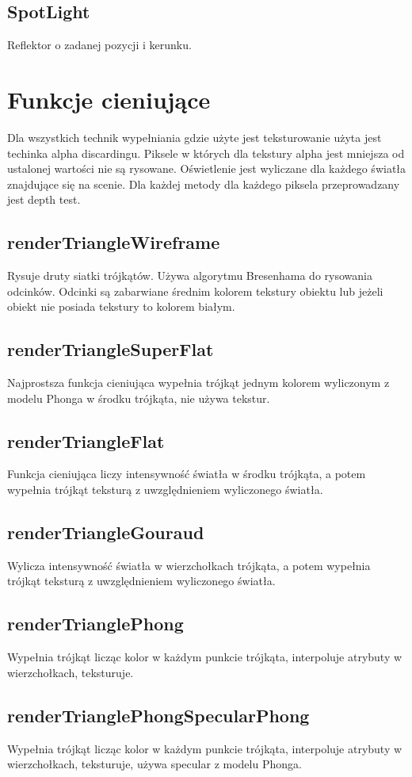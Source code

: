 \documentclass[onecolumn]{article}
\begin{document}
\subsection{SpotLight}
Reflektor o zadanej pozycji i kerunku.

\section{Funkcje cieniujące}
Dla wszystkich technik wypełniania gdzie użyte jest teksturowanie użyta jest techinka alpha discardingu. Piksele w których dla tekstury alpha jest mniejsza od ustalonej wartości nie są rysowane. Oświetlenie jest wyliczane dla każdego światła znajdujące się na scenie. Dla każdej metody dla każdego piksela przeprowadzany jest depth test.
\subsection{renderTriangleWireframe}
Rysuje druty siatki trójkątów. Używa algorytmu Bresenhama do rysowania odcinków. Odcinki są zabarwiane średnim kolorem tekstury obiektu lub jeżeli obiekt nie posiada tekstury to kolorem białym.

\subsection{renderTriangleSuperFlat}
Najprostsza funkcja cieniująca wypełnia trójkąt jednym kolorem wyliczonym z modelu Phonga w środku trójkąta, nie używa tekstur.

\subsection{renderTriangleFlat}
Funkcja cieniująca liczy intensywność światła w środku trójkąta, a potem wypełnia trójkąt teksturą z uwzględnieniem wyliczonego światła.

\subsection{renderTriangleGouraud}
Wylicza intensywność światła w wierzchołkach trójkąta, a potem wypełnia trójkąt teksturą z uwzględnieniem wyliczonego światła.

\subsection{renderTrianglePhong}
Wypełnia trójkąt licząc kolor w każdym punkcie trójkąta, interpoluje atrybuty w wierzchołkach, teksturuje.

\subsection{renderTrianglePhongSpecularPhong}
Wypełnia trójkąt licząc kolor w każdym punkcie trójkąta, interpoluje atrybuty w wierzchołkach, teksturuje, używa specular z modelu Phonga.
\end{document}

